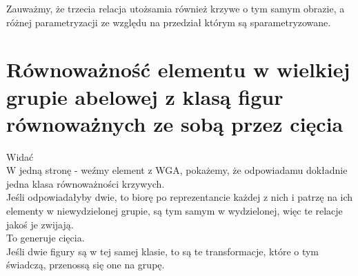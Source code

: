 \documentclass[a4paper, 12pt]{article}
\begin{document}
Zauważmy, że trzecia relacja utożsamia również krzywe o tym samym obrazie, a różnej parametryzacji ze
względu na przedział którym są sparametryzowane.
\section{Równoważność elementu w wielkiej grupie abelowej z klasą figur równoważnych ze sobą przez cięcia}
Widać \\
W jedną stronę - weźmy element z WGA, pokażemy, że odpowiadamu dokładnie jedna klasa równoważności krzywych.
\\
Jeśli odpowiadałyby dwie, to biorę po reprezentancie każdej z nich i patrzę na ich elementy w niewydzielonej
grupie, są tym samym w wydzielonej, więc te relacje jakoś je zwijają. \\
To generuje cięcia. \\
Jeśli dwie figury są w tej samej klasie, to są te transformacje, które o tym świadczą, przenossą się one na
grupę. \\
\end{document}
